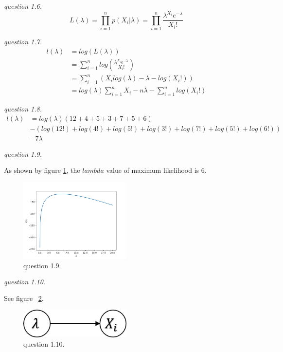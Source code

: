 \documentclass{article}
\begin{document}
\vspace{\baselineskip}
\textit{question 1.6.}
$$L(\lambda)=\prod_{i=1}^np(X_i|\lambda)=\prod_{i=1}^n\frac{\lambda^{X_i}e^{-\lambda}}{X_i!}$$

\vspace{\baselineskip}
\textit{question 1.7.}
\begin{align*}
    l(\lambda)&=log(L(\lambda))\\&=\sum_{i=1}^nlog(\frac{\lambda^{X_i}e^{-\lambda}}{X_i!})\\&=\sum_{i=1}^n(X_ilog(\lambda) - \lambda - log(X_i!))\\&= log(\lambda)\sum_{i=1}^n X_i - n\lambda - \sum_{i=1}^nlog(X_i!)
\end{align*}

\vspace{\baselineskip}
\textit{question 1.8.}
\begin{align*}
    l(\lambda)&=log(\lambda)(12+4+5+3+7+5+6) \\&- (log(12!)+log(4!)+log(5!)+log(3!)+log(7!)+log(5!)+log(6!)) \\&- 7\lambda
\end{align*}

\vspace{\baselineskip}
\textit{question 1.9.}

As shown by figure \ref{fig:1-9}, the $lambda$ value of maximum likelihood is 6.

\begin{figure}[H]
    \centering
    \includegraphics[width=0.5\textwidth]{1-9}
    \caption{question 1.9.}
    \label{fig:1-9}
\end{figure}

\vspace{\baselineskip}
\textit{question 1.10.}

See figure ~\ref{fig:1-10}.

\begin{figure}[H]
    \centering
        \includegraphics[width=0.5\textwidth]{1-10}
    \caption{question 1.10.}
    \label{fig:1-10}
\end{figure}
\end{document}
